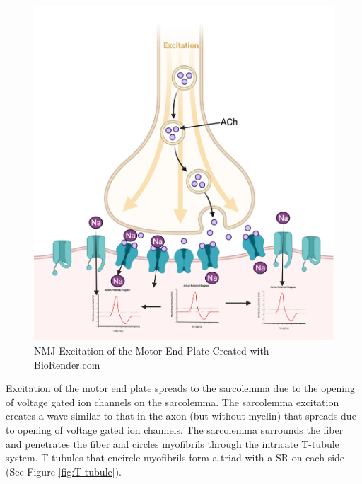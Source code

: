 \begin{figure}[!ht]
    \centering
    \includegraphics[width=1\linewidth]{./figure/NMJ.png}
    \caption{NMJ Excitation of the Motor End Plate \footnotesize{Created with BioRender.com}}
    \label{fig:NMJ}
\end{figure}

Excitation of the motor end plate spreads to the sarcolemma due to the opening of voltage gated ion channels on the sarcolemma. The sarcolemma excitation creates a wave similar to that in the axon (but without myelin) that spreads due to opening of voltage gated ion channels. The sarcolemma surrounds the fiber and penetrates the fiber and circles myofibrils through the intricate T-tubule system. T-tubules that encircle myofibrils form a triad with a SR on each side (See Figure \ref{fig:T-tubule}).


